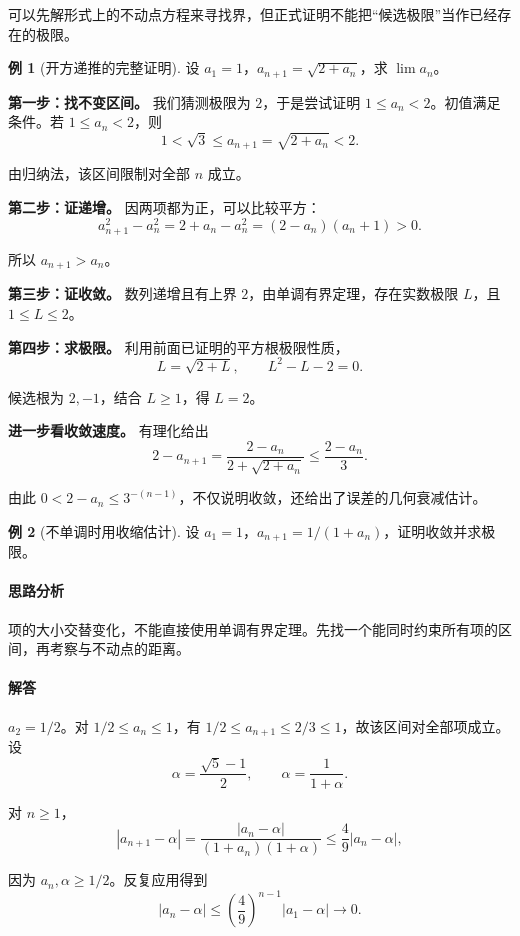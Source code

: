 \documentclass[UTF8,fontset=fandol,12pt,oneside,openany]{ctexrep}
\theoremstyle{definition}
\newtheorem{example}{例}[chapter]
\begin{document}
可以先解形式上的不动点方程来寻找界，但正式证明不能把“候选极限”当作已经存在的极限。

\begin{example}[开方递推的完整证明]
设 $a_1=1$，$a_{n+1}=\sqrt{2+a_n}$，求 $\lim a_n$。
\end{example}

\textbf{第一步：找不变区间。} 我们猜测极限为 $2$，于是尝试证明 $1\le a_n<2$。初值满足条件。若 $1\le a_n<2$，则
\[
1<\sqrt3\le a_{n+1}=\sqrt{2+a_n}<2.
\]

由归纳法，该区间限制对全部 $n$ 成立。

\textbf{第二步：证递增。} 因两项都为正，可以比较平方：
\[
a_{n+1}^2-a_n^2=2+a_n-a_n^2=(2-a_n)(a_n+1)>0.
\]

所以 $a_{n+1}>a_n$。

\textbf{第三步：证收敛。} 数列递增且有上界 $2$，由单调有界定理，存在实数极限 $L$，且 $1\le L\le2$。

\textbf{第四步：求极限。} 利用前面已证明的平方根极限性质，
\[
L=\sqrt{2+L},\qquad L^2-L-2=0.
\]

候选根为 $2,-1$，结合 $L\ge1$，得 $L=2$。

\textbf{进一步看收敛速度。} 有理化给出
\[
2-a_{n+1}=\frac{2-a_n}{2+\sqrt{2+a_n}}
\le\frac{2-a_n}{3}.
\]

由此 $0<2-a_n\le3^{-(n-1)}$，不仅说明收敛，还给出了误差的几何衰减估计。

\begin{example}[不单调时用收缩估计]
设 $a_1=1$，$a_{n+1}=1/(1+a_n)$，证明收敛并求极限。
\end{example}

\paragraph{思路分析} 项的大小交替变化，不能直接使用单调有界定理。先找一个能同时约束所有项的区间，再考察与不动点的距离。

\paragraph{解答} $a_2=1/2$。对 $1/2\le a_n\le1$，有 $1/2\le a_{n+1}\le2/3\le1$，故该区间对全部项成立。设
\[
\alpha=\frac{\sqrt5-1}{2},\qquad\alpha=\frac1{1+\alpha}.
\]

对 $n\ge1$，
\[
|a_{n+1}-\alpha|
=\frac{|a_n-\alpha|}{(1+a_n)(1+\alpha)}
\le\frac49|a_n-\alpha|,
\]

因为 $a_n,\alpha\ge1/2$。反复应用得到
\[
|a_n-\alpha|\le\left(\frac49\right)^{n-1}|a_1-\alpha|\to0.
\]
\end{document}
